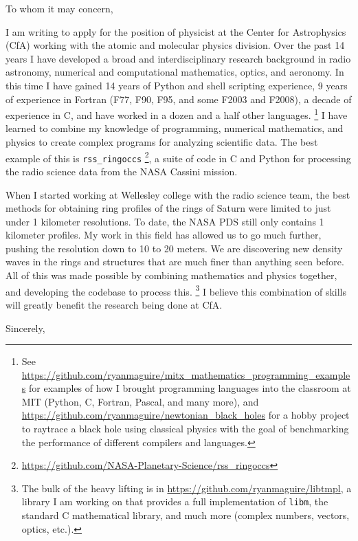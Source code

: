 \documentclass{letter}
\begin{document}
    \begin{letter}{}
        \opening{To whom it may concern,}
            I am writing to apply for the position of physicist at the
            Center for Astrophysics (CfA) working with the atomic and
            molecular physics division.
            Over the past 14 years I have developed a broad and
            interdisciplinary research background in radio astronomy,
            numerical and computational mathematics, optics, and aeronomy.
            In this time I have gained 14 years of Python and shell scripting
            experience, 9 years of experience in Fortran (F77, F90, F95,
            and some F2003 and F2008), a decade of experience in C, and
            have worked in a dozen and a half other languages.%
            \footnote{%
                See \url{https://github.com/ryanmaguire/mitx_mathematics_programming_examples}
                for examples of how I brought programming languages into the
                classroom at MIT (Python, C, Fortran, Pascal, and many more),
                and \url{https://github.com/ryanmaguire/newtonian_black_holes}
                for a hobby project to raytrace a black hole using classical
                physics with the goal of benchmarking the performance of
                different compilers and languages.
            }
            I have learned to combine my knowledge of programming,
            numerical mathematics, and physics to create complex programs
            for analyzing scientific data.
            The best example of this is \texttt{rss\_ringoccs}%
            \footnote{%
                \url{https://github.com/NASA-Planetary-Science/rss_ringoccs}
            },
            a suite of code in C and Python for processing the radio science
            data from the NASA Cassini mission.
            \par
            When I started working at Wellesley college with the radio science
            team, the best methods for obtaining ring profiles of the rings of
            Saturn were limited to just under 1 kilometer resolutions.
            To date, the NASA PDS still only contains 1 kilometer profiles.
            My work in this
            field has allowed us to go much further, pushing the resolution
            down to 10 to 20 meters. We are discovering new density waves in
            the rings and structures that are much finer than anything seen before.
            All of this was made possible by combining mathematics and physics
            together, and developing the codebase to process this.%
            \footnote{
                The bulk of the heavy lifting is in
                \url{https://github.com/ryanmaguire/libtmpl},
                a library I am working on that provides a full implementation
                of \texttt{libm}, the standard C mathematical library,
                and much more (complex numbers, vectors, optics, etc.).
            }
            I believe this combination of skills will greatly benefit
            the research being done at CfA.
        \closing{Sincerely,}
    \end{letter}
\end{document}
